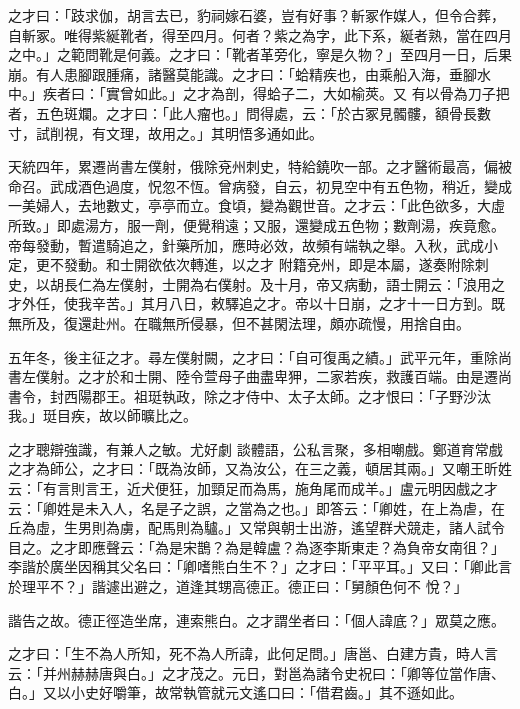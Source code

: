 \begin{pinyinscope}
 之才曰：「跂求伽，胡言去已，豹祠嫁石婆，豈有好事？斬冢作媒人，但令合葬，自斬冢。唯得紫綖靴者，得至四月。何者？紫之為字，此下系，綖者熟，當在四月之中。」之範問靴是何義。之才曰：「靴者革旁化，寧是久物？」至四月一日，后果崩。有人患腳跟腫痛，諸醫莫能識。之才曰：「蛤精疾也，由乘船入海，垂腳水中。」疾者曰：「實曾如此。」之才為剖，得蛤子二，大如榆莢。又
 有以骨為刀子把者，五色斑斕。之才曰：「此人瘤也。」問得處，云：「於古冢見髑髏，額骨長數寸，試削視，有文理，故用之。」其明悟多通如此。



 天統四年，累遷尚書左僕射，俄除兗州刺史，特給鐃吹一部。之才醫術最高，偏被命召。武成酒色過度，怳忽不恆。曾病發，自云，初見空中有五色物，稍近，變成一美婦人，去地數丈，亭亭而立。食頃，變為觀世音。之才云：「此色欲多，大虛所致。」即處湯方，服一劑，便覺稍遠；又服，還變成五色物；數劑湯，疾竟愈。帝每發動，暫遣騎追之，針藥所加，應時必效，故頻有端執之舉。入秋，武成小定，更不發動。和士開欲依次轉進，以之才
 附籍兗州，即是本屬，遂奏附除刺史，以胡長仁為左僕射，士開為右僕射。及十月，帝又病動，語士開云：「浪用之才外任，使我辛苦。」其月八日，敕驛追之才。帝以十日崩，之才十一日方到。既無所及，復還赴州。在職無所侵暴，但不甚閑法理，頗亦疏慢，用捨自由。



 五年冬，後主征之才。尋左僕射闕，之才曰：「自可復禹之績。」武平元年，重除尚書左僕射。之才於和士開、陸令萱母子曲盡卑狎，二家若疾，救護百端。由是遷尚書令，封西陽郡王。祖珽執政，除之才侍中、太子太師。之才恨曰：「子野沙汰我。」珽目疾，故以師曠比之。



 之才聰辯強識，有兼人之敏。尤好劇
 談體語，公私言聚，多相嘲戲。鄭道育常戲之才為師公，之才曰：「既為汝師，又為汝公，在三之義，頓居其兩。」又嘲王昕姓云：「有言則言王，近犬便狂，加頸足而為馬，施角尾而成羊。」盧元明因戲之才云：「卿姓是未入人，名是子之誤，之當為之也。」即答云：「卿姓，在上為虐，在丘為虛，生男則為虜，配馬則為驢。」又常與朝士出游，遙望群犬競走，諸人試令目之。之才即應聲云：「為是宋鵲？為是韓盧？為逐李斯東走？為負帝女南徂？」李諧於廣坐因稱其父名曰：「卿嗜熊白生不？」之才曰：「平平耳。」又曰：「卿此言於理平不？」諧遽出避之，道逢其甥高德正。德正曰：「舅顏色何不
 悅？」



 諧告之故。德正徑造坐席，連索熊白。之才謂坐者曰：「個人諱底？」眾莫之應。



 之才曰：「生不為人所知，死不為人所諱，此何足問。」唐邕、白建方貴，時人言云：「并州赫赫唐與白。」之才茂之。元日，對邕為諸令史祝曰：「卿等位當作唐、白。」又以小史好嚼筆，故常執管就元文遙口曰：「借君齒。」其不遜如此。




\end{pinyinscope}
